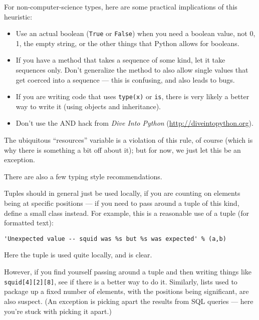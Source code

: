 For non-computer-science types, here are some practical implications of
this heuristic:

\begin{itemize}

\item Use an actual boolean (\verb|True| or \verb|False|) when you need a
boolean value, not 0, 1, the empty string, or the other things that Python
allows for booleans.

\item If you have a method that takes a sequence of some kind, let it take
sequences only.  Don't generalize the method to also allow single values
that get coerced into a sequence --- this is confusing, and also leads to
bugs.

\item If you are writing code that uses \verb|type(x)| or \verb|is|,
there is very likely a better way to write it (using objects and
inheritance).

\item Don't use the AND hack from \emph{Dive Into Python}
(\url{http://diveintopython.org}).

\end{itemize}

The ubiquitous ``resources'' variable is a violation of this rule, of
course (which is why there is something a bit off about it); but for now,
we just let this be an exception.

There are also a few typing style recommendations.

Tuples should in general just be used locally, if you are counting on
elements being at specific positions --- if you need to pass around a tuple
of this kind, define a small class instead.  For example, this is a
reasonable use of a tuple (for formatted text):

\begin{verbatim}
'Unexpected value -- squid was %s but %s was expected' % (a,b)
\end{verbatim}

Here the tuple is used quite locally, and is clear.

However, if you find yourself passing around a tuple and then writing
things like \verb|squid[4][2][8]|, see if there is a better way to do it.
Similarly, lists used to package up a fixed number of elements, with the
positions being significant, are also suspect.  (An exception is picking
apart the results from SQL queries --- here you're stuck with picking it
apart.)


